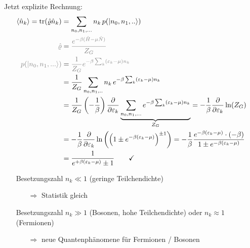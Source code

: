 Jetzt explizite Rechnung:
\begin{align}
    \expval{\hat{n}_k} = \trace(\hat{\varrho}\hat{n}_k) &= \sum_{n_0,n_1,...} n_k \, p(\ket{n_0,n_1,..})\\ \color{black!50}
    \hat{\varrho} &= \color{black!50}\frac{e^{-\beta(\hat{H}-\mu\hat{N})}}{Z_G} \\
    \color{black!50}p(\ket{n_0,n_1,...}) &= \color{black!50}\frac{1}{Z_G} e^{-\beta \sum_k (\varepsilon_k-\mu)n_k}\\
    &= \frac{1}{Z_G} \sum_{n_0,n_1,..} n_k \, e^{-\beta \sum_k (\varepsilon_k-\mu)n_k}\\
    &= \frac{1}{Z_G} \left(-\frac{1}{\beta} \right) \pdv{\varepsilon_k} \underbrace{\sum_{n_0,n_1,...} e^{-\beta \sum_k (\varepsilon_k-\mu)n_k}}_{Z_G} = -\frac{1}{\beta} \pdv{\varepsilon_k} \ln(Z_G)\\
    &= -\frac{1}{\beta} \pdv{\varepsilon_k} \ln\left(\left(1 \pm e^{-\beta(\varepsilon_k-\mu)}\right)^{\pm 1} \right) = - \frac{1}{\beta} \frac{e^{-\beta(\varepsilon_k-\mu)} \cdot (-\beta)}{1 \pm e^{-\beta(\varepsilon_k-\mu)}} \\
    &= \frac{1}{e^{+\beta(\varepsilon_k-\mu)}\pm 1} \qquad \checkmark
\end{align}
\begin{center}
\end{center}
\begin{itemize}
    \item[] Besetzungszahl $n_k \ll 1$ (geringe Teilchendichte)
    \begin{itemize}
        \item[$\Rightarrow$] Statistik gleich 
    \end{itemize}
    \item[] Besetzungszahl $n_k \gg 1$ (Bosonen, hohe Teilchendichte) oder $n_k \approx 1$ (Fermionen)
    \begin{itemize}
        \item[$\Rightarrow$] neue Quantenphänomene für Fermionen / Bosonen 
    \end{itemize}
\end{itemize}

